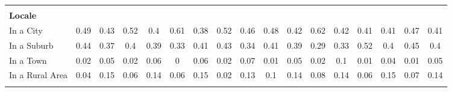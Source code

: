 \begin{tabular*}{\linewidth}{@{\extracolsep{\fill} } lcccccccccccccccc}
&&&&&&&&&&&&&&&&\\%
\multicolumn{17}{l}{\bfseries Locale}\\%
\hspace{0.2cm}In a City&0.49&0.43&0.52&0.4&0.61&0.38&0.52&0.46&0.48&0.42&0.62&0.42&0.41&0.41&0.47&0.41\\%
\hspace{0.2cm}In a Suburb&0.44&0.37&0.4&0.39&0.33&0.41&0.43&0.34&0.41&0.39&0.29&0.33&0.52&0.4&0.45&0.4\\%
\hspace{0.2cm}In a Town&0.02&0.05&0.02&0.06&0&0.06&0.02&0.07&0.01&0.05&0.02&0.1&0.01&0.04&0.01&0.05\\%
\hspace{0.2cm}In a Rural Area&0.04&0.15&0.06&0.14&0.06&0.15&0.02&0.13&0.1&0.14&0.08&0.14&0.06&0.15&0.07&0.14\\%
&&&&&&&&&&&&&&&&\\%
\hline%
\end{tabular*}